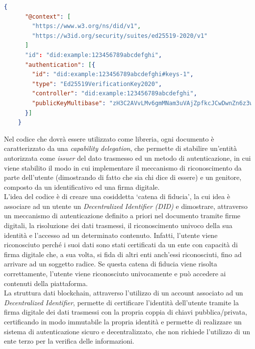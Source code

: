 \begin{lstlisting}[language=json]
    {
      "@context": [
        "https://www.w3.org/ns/did/v1",
        "https://w3id.org/security/suites/ed25519-2020/v1"
      ]
      "id": "did:example:123456789abcdefghi",
      "authentication": [{    
        "id": "did:example:123456789abcdefghi#keys-1",
        "type": "Ed25519VerificationKey2020",
        "controller": "did:example:123456789abcdefghi",
        "publicKeyMultibase": "zH3C2AVvLMv6gmMNam3uVAjZpfkcJCwDwnZn6z3wXmqPV"
      }]
    }
\end{lstlisting}

\newpage

Nel codice che dovrà essere utilizzato come libreria,
ogni documento è caratterizzato da una \textit{capability delegation}, che permette di stabilire un'entità autorizzata come \textit{issuer} del dato trasmesso ed 
un metodo di autenticazione, in cui viene stabilito il modo in cui implementare il meccanismo di riconoscimento da parte dell'utente (dimostrando di fatto che sia chi dice di essere) e un 
genitore, composto da un identificativo ed una firma digitale. \\

L'idea del codice è di creare una cosiddetta `catena di fiducia', la cui idea è associare ad un utente un \textit{Decentralized Identifier (DID)} e dimostrare,
attraverso un meccanismo di autenticazione definito a priori nel documento tramite firme digitali, la risoluzione dei dati trasmessi, il riconoscimento univoco della sua identità
e l'accesso ad un determinato contenuto. Infatti, l'utente viene riconosciuto perché i suoi dati sono stati certificati da un ente 
con capacità di firma digitale che, a sua volta, si fida di altri enti anch'essi riconosciuti, fino ad arrivare ad un soggetto radice.
Se questa catena di fiducia viene risolta correttamente, l'utente viene riconosciuto univocamente e può accedere ai contenuti della piattaforma. \\

La struttura dati blockchain, attraverso l'utilizzo di un account associato ad un \textit{Decentralized Identifier}, permette di certificare l'identità dell'utente
tramite la firma digitale dei dati trasmessi con la propria coppia di chiavi pubblica/privata, certificando in modo immutabile la propria identità e
permette di realizzare un sistema di autenticazione sicuro e decentralizzato, che non richiede l'utilizzo di un ente terzo per la verifica delle informazioni. \\

